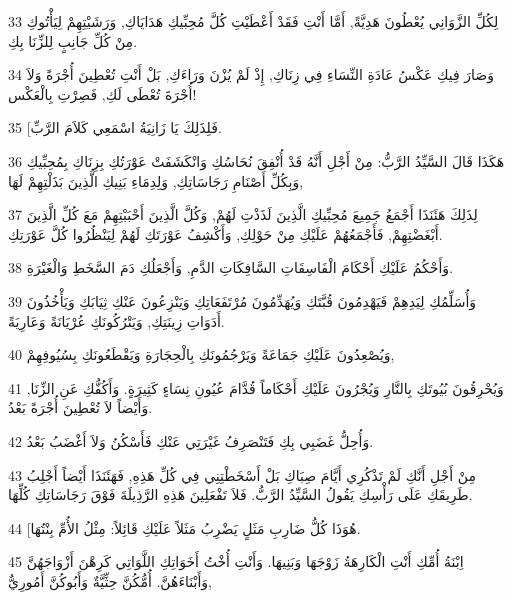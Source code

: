 \par 33 لِكُلِّ الزَّوَانِي يُعْطُونَ هَدِيَّةً, أَمَّا أَنْتِ فَقَدْ أَعْطَيْتِ كُلَّ مُحِبِّيكِ هَدَايَاكِ, وَرَشَيْتِهِمْ لِيَأْتُوكِ مِنْ كُلِّ جَانِبٍ لِلزِّنَا بِكِ.
\par 34 وَصَارَ فِيكِ عَكْسُ عَادَةِ النِّسَاءِ فِي زِنَاكِ, إِذْ لَمْ يُزْنَ وَرَاءَكِ, بَلْ أَنْتِ تُعْطِينَ أُجْرَةً وَلاَ أُجْرَةَ تُعْطَى لَكِ, فَصِرْتِ بِالْعَكْس!
\par 35 [فَلِذَلِكَ يَا زَانِيَةُ اسْمَعِي كَلاَمَ الرَّبِّ.
\par 36 هَكَذَا قَالَ السَّيِّدُ الرَّبُّ: مِنْ أَجْلِ أَنَّهُ قَدْ أُنْفِقَ نُحَاسُكِ وَانْكَشَفَتْ عَوْرَتُكِ بِزِنَاكِ بِمُحِبِّيكِ وَبِكُلِّ أَصْنَامِ رَجَاسَاتِكِ, وَلِدِمَاءِ بَنِيكِ الَّذِينَ بَذَلْتِهِمْ لَهَا,
\par 37 لِذَلِكَ هَئَنَذَا أَجْمَعُ جَمِيعَ مُحِبِّيكِ الَّذِينَ لَذَذْتِ لَهُمْ, وَكُلَّ الَّذِينَ أَحْبَبْتِهِمْ مَعَ كُلِّ الَّذِينَ أَبْغَضْتِهِمْ, فَأَجْمَعُهُمْ عَلَيْكِ مِنْ حَوْلِكِ, وَأَكْشِفُ عَوْرَتَكِ لَهُمْ لِيَنْظُرُوا كُلَّ عَوْرَتِكِ.
\par 38 وَأَحْكُمُ عَلَيْكِ أَحْكَامَ الْفَاسِقَاتِ السَّافِكَاتِ الدَّمِ, وَأَجْعَلُكِ دَمَ السَّخَطِ وَالْغَيْرَةِ.
\par 39 وَأُسَلِّمُكِ لِيَدِهِمْ فَيَهْدِمُونَ قُبَّتَكِ وَيُهَدِّمُونَ مُرْتَفَعَاتِكِ وَيَنْزِعُونَ عَنْكِ ثِيَابَكِ وَيَأْخُذُونَ أَدَوَاتِ زِينَتِكِ, وَيَتْرُكُونَكِ عُرْيَانَةً وَعَارِيَةً.
\par 40 وَيُصْعِدُونَ عَلَيْكِ جَمَاعَةً وَيَرْجُمُونَكِ بِالْحِجَارَةِ وَيَقْطَعُونَكِ بِسُيُوفِهِمْ,
\par 41 وَيُحْرِقُونَ بُيُوتَكِ بِالنَّارِ وَيُجْرُونَ عَلَيْكِ أَحْكَاماً قُدَّامَ عُيُونِ نِسَاءٍ كَثِيرَةٍ. وَأَكُفُّكِ عَنِ الزِّنَا, وَأَيْضاً لاَ تُعْطِينَ أُجْرَةً بَعْدُ.
\par 42 وَأُحِلُّ غَضَبِي بِكِ فَتَنْصَرِفُ غَيْرَتِي عَنْكِ فَأَسْكُنُ وَلاَ أَغْضَبُ بَعْدُ.
\par 43 مِنْ أَجْلِ أَنَّكِ لَمْ تَذْكُرِي أَيَّامَ صِبَاكِ بَلْ أَسْخَطْتِنِي فِي كُلِّ هَذِهِ, فَهَئَنَذَا أَيْضاً أَجْلِبُ طَرِيقَكِ عَلَى رَأْسِكِ يَقُولُ السَّيِّدُ الرَّبُّ. فَلاَ تَفْعَلِينَ هَذِهِ الرَّذِيلَةَ فَوْقَ رَجَاسَاتِكِ كُلِّهَا.
\par 44 [هُوَذَا كُلُّ ضَارِبِ مَثَلٍ يَضْرِبُ مَثَلاً عَلَيْكِ قَائِلاً: مِثْلُ الأُمِّ بِنْتُهَا.
\par 45 اِبْنَةُ أُمِّكِ أَنْتِ الْكَارِهَةُ زَوْجَهَا وَبَنِيهَا. وَأَنْتِ أُخْتُ أَخَوَاتِكِ اللَّوَاتِي كَرِهْنَ أَزْوَاجَهُنَّ وَأَبْنَاءَهُنَّ. أُمُّكُنَّ حِثِّيَّةٌ وَأَبُوكُنَّ أَمُورِيٌّ,
